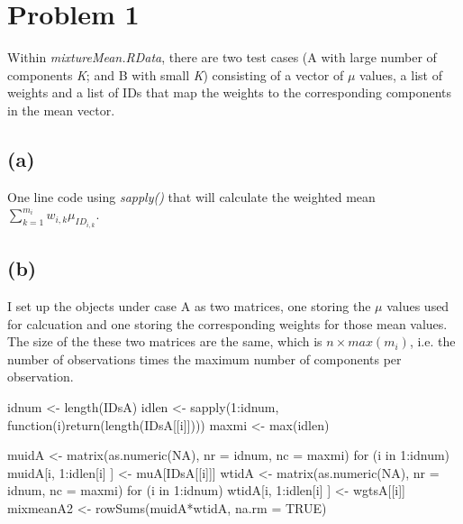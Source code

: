 \documentclass{article}
\begin{document}
\section*{Problem 1}

Within \textit{mixtureMean.RData}, there are two test cases (A with large number of components \textit{K}; 
and B with small \textit{K}) consisting of a vector of $\mu$ values, a list of weights and a list of IDs that
map the weights to the corresponding components in the mean vector.

\subsection*{(a)}
One line code using \textit{sapply()} that will calculate the weighted mean $\sum_{k=1}^{m_i} w_{i,k}\mu_{ID_{i,k}}$.



\subsection*{(b)}
I set up the objects under case A as two matrices, one storing the $\mu$ values used for calcuation and one
storing the corresponding weights for those mean values. The size of the these two matrices are the same,
which is $n \times max(m_i)$, i.e. the number of observations times the maximum number of components per observation.

idnum <- length(IDsA)
idlen <- sapply(1:idnum, function(i){return(length(IDsA[[i]]))})
maxmi <- max(idlen)

muidA <- matrix(as.numeric(NA), nr = idnum, nc = maxmi)
for (i in 1:idnum) {
	muidA[i, 1:idlen[i] ] <- muA[IDsA[[i]]]
}
wtidA <- matrix(as.numeric(NA), nr = idnum, nc = maxmi)
for (i in 1:idnum) {
	wtidA[i, 1:idlen[i] ] <- wgtsA[[i]]
}
mixmeanA2 <- rowSums(muidA*wtidA, na.rm = TRUE)
\end{document}
